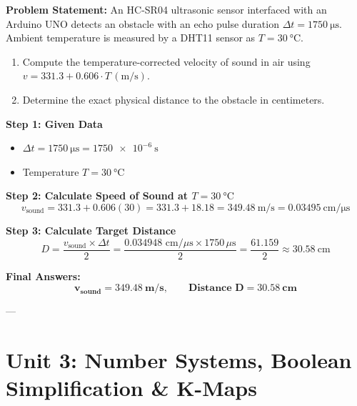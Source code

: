 \begin{example}
\textbf{Problem Statement:} An HC-SR04 ultrasonic sensor interfaced with an Arduino UNO detects an obstacle with an echo pulse duration $\Delta t = \SI{1750}{\micro\second}$. Ambient temperature is measured by a DHT11 sensor as $T = \SI{30}{\celsius}$.
\begin{enumerate}
    \item Compute the temperature-corrected velocity of sound in air using $v = 331.3 + 0.606 \cdot T\,(\si{\meter\per\second})$.
    \item Determine the exact physical distance to the obstacle in centimeters.
\end{enumerate}

\tcblower
\textbf{Step 1: Given Data}
\begin{itemize}
    \item $\Delta t = \SI{1750}{\micro\second} = \SI{1750e-6}{\second}$
    \item Temperature $T = \SI{30}{\celsius}$
\end{itemize}

\textbf{Step 2: Calculate Speed of Sound at $T = \SI{30}{\celsius}$}
\begin{equation*}
    v_{\text{sound}} = 331.3 + 0.606(30) = 331.3 + 18.18 = \SI{349.48}{\meter\per\second} = \SI{0.03495}{\centi\meter\per\micro\second}
\end{equation*}

\textbf{Step 3: Calculate Target Distance}
\begin{equation*}
    D = \frac{v_{\text{sound}} \times \Delta t}{2} = \frac{0.034948\text{ cm/}\mu\text{s} \times 1750\,\mu\text{s}}{2} = \frac{61.159}{2} \approx \SI{30.58}{\centi\meter}
\end{equation*}

\textbf{Final Answers:}
$$\mathbf{v_{\text{sound}} = \SI{349.48}{\meter\per\second}, \qquad \text{Distance } D = \SI{30.58}{\centi\meter}}$$
\end{example}

---

\section{Unit 3: Number Systems, Boolean Simplification \& K-Maps}

